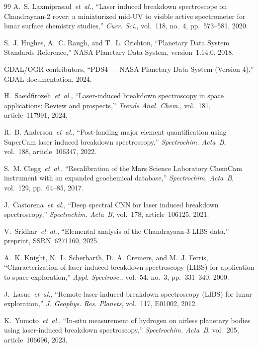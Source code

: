 \documentclass[a4paper,twocolumn,10pt]{article}
\begin{document}
\begin{thebibliography}{99}
A.~S. Laxmiprasad~\emph{et~al.},
``Laser induced breakdown spectroscope on Chandrayaan-2 rover:
a miniaturized mid-UV to visible active spectrometer for lunar surface
chemistry studies,''
\textit{Curr. Sci.}, vol.~118, no.~4, pp.~573--581, 2020.

S.~J. Hughes, A.~C. Raugh, and T.~L. Crichton,
``Planetary Data System Standards Reference,''
NASA Planetary Data System, version~1.14.0, 2018.

GDAL/OGR contributors,
``PDS4 --- NASA Planetary Data System (Version 4),''
GDAL documentation, 2024.

H.~Saeidfirozeh~\emph{et~al.},
``Laser-induced breakdown spectroscopy in space applications:
Review and prospects,''
\textit{Trends Anal. Chem.}, vol.~181, article~117991, 2024.

R.~B. Anderson~\emph{et~al.},
``Post-landing major element quantification using SuperCam laser
induced breakdown spectroscopy,''
\textit{Spectrochim. Acta~B}, vol.~188, article~106347, 2022.

S.~M. Clegg~\emph{et~al.},
``Recalibration of the Mars Science Laboratory ChemCam instrument
with an expanded geochemical database,''
\textit{Spectrochim. Acta~B}, vol.~129, pp.~64--85, 2017.

J.~Castorena~\emph{et~al.},
``Deep spectral CNN for laser induced breakdown spectroscopy,''
\textit{Spectrochim. Acta~B}, vol.~178, article~106125, 2021.

V.~Sridhar~\emph{et~al.},
``Elemental analysis of the Chandrayaan-3 LIBS data,''
preprint, SSRN~6271160, 2025.

A.~K. Knight, N.~L. Scherbarth, D.~A. Cremers, and M.~J. Ferris,
``Characterization of laser-induced breakdown spectroscopy (LIBS)
for application to space exploration,''
\textit{Appl. Spectrosc.}, vol.~54, no.~3, pp.~331--340, 2000.

J.~Lasue~\emph{et~al.},
``Remote laser-induced breakdown spectroscopy (LIBS) for lunar
exploration,''
\textit{J. Geophys. Res. Planets}, vol.~117, E01002, 2012.

K.~Yumoto~\emph{et~al.},
``In-situ measurement of hydrogen on airless planetary bodies using
laser-induced breakdown spectroscopy,''
\textit{Spectrochim. Acta~B}, vol.~205, article~106696, 2023.


\end{thebibliography}
\end{document}
